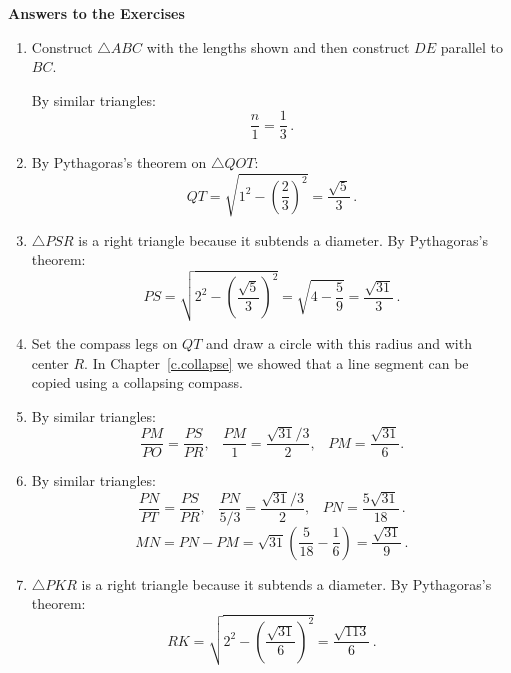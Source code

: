 \newpage

\begin{center}
\textbf{\Large Answers to the Exercises}
\end{center}

\begin{enumerate}

\item Construct $\triangle ABC$ with the lengths shown and then construct $DE$ parallel to $BC$. 
\vspace*{-1ex}
\begin{center}
\end{center}
By similar triangles:
\[
\frac{n}{1} = \frac{1}{3}\,.
\]

\item By Pythagoras's theorem on $\triangle QOT$:
\[
QT = \sqrt{1^2-\left(\frac{2}{3}\right)^2}=\frac{\sqrt{5}}{3}\,.
\]

\item $\triangle PSR$ is a right triangle because it subtends a diameter. By Pythagoras's theorem:
\[
PS = \sqrt{2^2-\left(\frac{\sqrt{5}}{3}\right)^2}=\sqrt{4-\frac{5}{9}}=\frac{\sqrt{31}}{3}\,.
\]

\item Set the compass legs on $QT$ and draw a circle with this radius and with center $R$. In Chapter~\ref{c.collapse} we showed that a line segment can be copied using a collapsing compass.

\item By similar triangles:
\[
\frac{PM}{PO}=\frac{PS}{PR},\;\;\;\frac{PM}{1}=\frac{\sqrt{31}/3}{2},\;\;\;PM=\frac{\sqrt{31}}{6}.
\]

\item By similar triangles:
\[
\frac{PN}{PT}=\frac{PS}{PR},\;\;\;\frac{PN}{5/3}=\frac{\sqrt{31}/3}{2},\;\;\;PN=\frac{5\sqrt{31}}{18}\,.
\]
\[
MN=PN-PM = \sqrt{31}\left(\frac{5}{18}-\frac{1}{6}\right) = \frac{\sqrt{31}}{9}\,.
\]

\item $\triangle PKR$ is a right triangle because it subtends a diameter. By Pythagoras's theorem:
\[
RK=\sqrt{2^2-\left(\frac{\sqrt{31}}{6}\right)^2} = \frac{\sqrt{113}}{6}\,.
\]


\end{enumerate}
